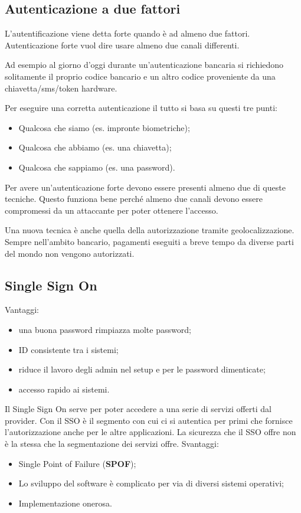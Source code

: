 \subsection{Autenticazione a due fattori}

L'autentificazione viene detta forte quando è ad almeno due fattori.
Autenticazione forte vuol dire usare almeno due canali differenti.

Ad esempio al giorno d'oggi durante un'autenticazione bancaria si richiedono
solitamente il proprio codice bancario e un altro codice proveniente da una
chiavetta/sms/token hardware.

Per eseguire una corretta autenticazione il tutto si basa su questi tre punti:
\begin{itemize}
 \item Qualcosa che siamo (es. impronte biometriche);
 \item Qualcosa che abbiamo (es. una chiavetta);
 \item Qualcosa che sappiamo (es. una password).
\end{itemize}

Per avere un'autenticazione forte devono essere presenti almeno due di queste
tecniche. Questo funziona bene perché almeno due canali devono essere
compromessi da un attaccante per poter ottenere l'accesso.

Una nuova tecnica è anche quella della autorizzazione tramite
geolocalizzazione. Sempre nell'ambito bancario, pagamenti eseguiti a breve
tempo da diverse parti del mondo non vengono autorizzati.

\subsection{Single Sign On}

Vantaggi:
\begin{itemize}
\item una buona password rimpiazza molte password;
\item ID consistente tra i sistemi;
\item riduce il lavoro degli admin nel setup e per le password dimenticate;
\item accesso rapido ai sistemi.
\end{itemize}


Il Single Sign On serve per poter accedere a una serie di servizi offerti dal
provider. Con il SSO è il segmento con cui ci si autentica per primi che
fornisce l'autorizzazione anche per le altre applicazioni.
La sicurezza che il SSO offre non è la stessa che la segmentazione dei servizi
offre.
Svantaggi:
\begin{itemize}
\item Single Point of Failure (\textbf{SPOF});
\item Lo sviluppo del software è complicato per via di diversi sistemi operativi;
\item Implementazione onerosa.
\end{itemize}

